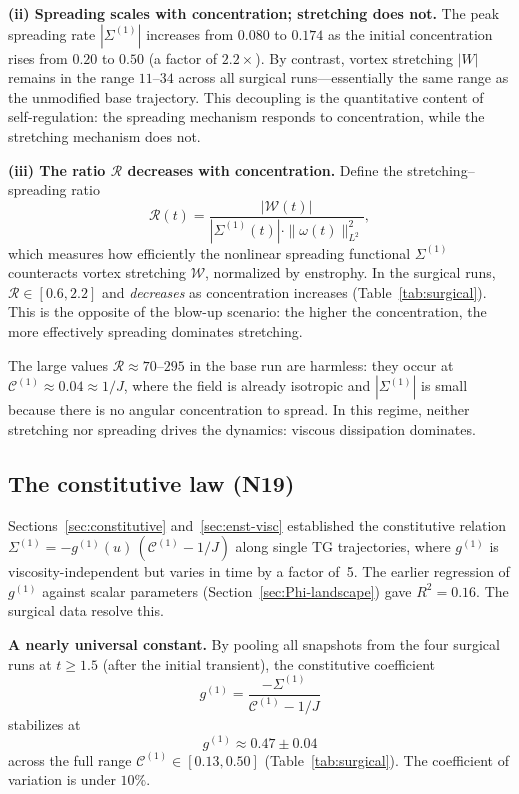 \documentclass[11pt]{article}
\theoremstyle{definition}
\newcommand{\cC}{\mathcal{C}}
\begin{document}
\medskip\noindent\textbf{(ii) Spreading scales with
concentration; stretching does not.}
The peak spreading rate $|\Sigma^{(1)}|$ increases
from $0.080$ to $0.174$ as the initial concentration
rises from $0.20$ to $0.50$ (a factor of $2.2\times$).
By contrast, vortex stretching $|W|$ remains in the
range $11$--$34$ across all surgical runs---essentially
the same range as the unmodified base trajectory.
This decoupling is the quantitative content of
self-regulation: the spreading mechanism responds
to concentration, while the stretching mechanism
does not.

\medskip\noindent\textbf{(iii) The ratio
$\mathcal{R}$ decreases with concentration.}
Define the stretching--spreading ratio
\begin{equation}\label{eq:R-ratio}
\mathcal{R}(t) = \frac{|\mathcal{W}(t)|}
{|\Sigma^{(1)}(t)|\cdot\|\omega(t)\|_{L^2}^2},
\end{equation}
which measures how efficiently the nonlinear
spreading functional $\Sigma^{(1)}$ counteracts
vortex stretching $\mathcal{W}$, normalized by
enstrophy.  In the surgical runs,
$\mathcal{R}\in[0.6, 2.2]$ and \emph{decreases}
as concentration increases
(Table~\ref{tab:surgical}).  This is the opposite
of the blow-up scenario: the higher the
concentration, the more effectively spreading
dominates stretching.

The large values $\mathcal{R}\approx 70$--$295$
in the base run are harmless: they occur at
$\cC^{(1)}\approx 0.04 \approx 1/J$, where the
field is already isotropic and $|\Sigma^{(1)}|$ is
small because there is no angular concentration to
spread.  In this regime, neither stretching nor
spreading drives the dynamics: viscous dissipation
dominates.


\subsection{The constitutive law (N19)}
\label{sec:constitutive-surgical}

Sections~\ref{sec:constitutive}
and~\ref{sec:enst-visc} established the constitutive
relation $\Sigma^{(1)} = -g^{(1)}(u)\,
(\cC^{(1)}-1/J)$ along single TG trajectories, where
$g^{(1)}$ is viscosity-independent but varies in
time by a factor of~5.  The earlier regression of
$g^{(1)}$ against scalar parameters
(Section~\ref{sec:Phi-landscape}) gave $R^2=0.16$.
The surgical data resolve this.

\medskip\noindent\textbf{A nearly universal
constant.}
By pooling all snapshots from the four surgical runs
at $t\geq 1.5$ (after the initial transient), the
constitutive coefficient
\begin{equation}\label{eq:g1-value}
g^{(1)} = \frac{-\Sigma^{(1)}}{\cC^{(1)}-1/J}
\end{equation}
stabilizes at
\begin{equation}\label{eq:g1-numerical}
g^{(1)} \approx 0.47 \pm 0.04
\end{equation}
across the full range
$\cC^{(1)}\in[0.13, 0.50]$
(Table~\ref{tab:surgical}).  The coefficient of
variation is under $10\%$.
\end{document}
